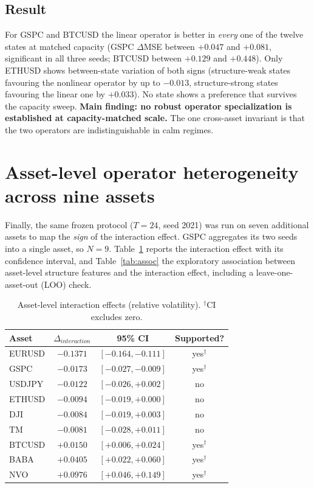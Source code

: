 \documentclass[preprint,12pt]{elsarticle}
\begin{document}
\subsection{Result}
For GSPC and BTCUSD the linear operator is better in \emph{every} one of the twelve states at
matched capacity (GSPC $\Delta$MSE between $+0.047$ and $+0.081$, significant in all three
seeds; BTCUSD between $+0.129$ and $+0.448$). Only ETHUSD shows between-state variation of both
signs (structure-weak states favouring the nonlinear operator by up to $-0.013$, structure-strong
states favouring the linear one by $+0.033$). No state shows a preference that survives the
capacity sweep. \textbf{Main finding: no robust operator specialization is established at
capacity-matched scale.} The one cross-asset invariant is that the two operators are
indistinguishable in calm regimes.

\section{Asset-level operator heterogeneity across nine assets}
\label{sec:assets}

Finally, the same frozen protocol ($T=24$, seed 2021) was run on seven additional assets to map
the \emph{sign} of the interaction effect. GSPC aggregates its two seeds into a single asset, so
$N=9$. Table~\ref{tab:assets} reports the interaction effect with its confidence interval, and
Table~\ref{tab:assoc} the exploratory association between asset-level structure features and the
interaction effect, including a leave-one-asset-out (LOO) check.

\begin{table}[!t]
\centering
\small
\caption{Asset-level interaction effects (relative volatility). $^\dagger$CI excludes zero.}
\label{tab:assets}
\begin{tabular}{@{}lccc@{}}
\toprule
Asset & $\Delta_{interaction}$ & 95\% CI & Supported? \\
\midrule
EURUSD & $-0.1371$ & $[-0.164,-0.111]$ & yes$^\dagger$ \\
GSPC   & $-0.0173$ & $[-0.027,-0.009]$ & yes$^\dagger$ \\
USDJPY & $-0.0122$ & $[-0.026,+0.002]$ & no \\
ETHUSD & $-0.0094$ & $[-0.019,+0.000]$ & no \\
DJI    & $-0.0084$ & $[-0.019,+0.003]$ & no \\
TM     & $-0.0081$ & $[-0.028,+0.011]$ & no \\
BTCUSD & $+0.0150$ & $[+0.006,+0.024]$ & yes$^\dagger$ \\
BABA   & $+0.0405$ & $[+0.022,+0.060]$ & yes$^\dagger$ \\
NVO    & $+0.0976$ & $[+0.046,+0.149]$ & yes$^\dagger$ \\
\bottomrule
\end{tabular}
\end{table}
\end{document}
